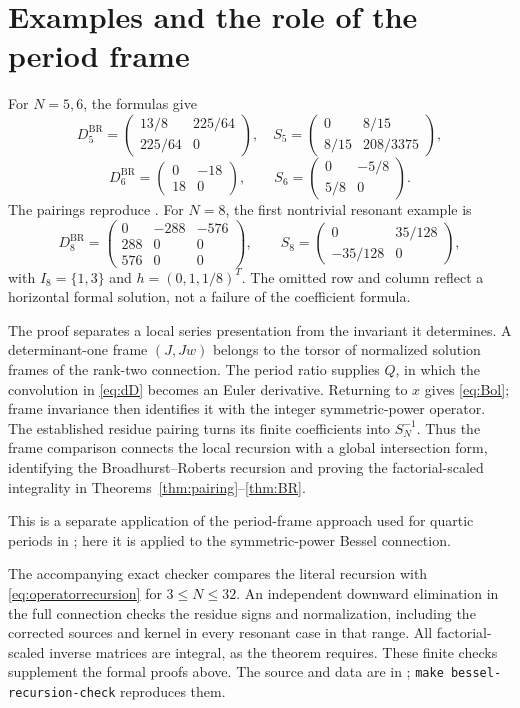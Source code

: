 \documentclass[11pt]{article}
\theoremstyle{definition}
\newcommand{\BR}{\mathrm{BR}}
\numberwithin{equation}{section}
\begin{document}
\section{Examples and the role of the period frame}

For $N=5,6$, the formulas give
\[
 D_5^{\BR}=\begin{pmatrix}13/8&225/64\\225/64&0\end{pmatrix},\quad
 S_5=\begin{pmatrix}0&8/15\\8/15&208/3375\end{pmatrix},
\]
\[
 D_6^{\BR}=\begin{pmatrix}0&-18\\18&0\end{pmatrix},\qquad
 S_6=\begin{pmatrix}0&-5/8\\5/8&0\end{pmatrix}.
\]
The pairings reproduce \cite[Examples 3.19--3.20]{FSY}.
For $N=8$, the first nontrivial resonant example is
\[
 D_8^{\BR}=\begin{pmatrix}0&-288&-576\\288&0&0\\576&0&0\end{pmatrix},
 \qquad S_8=\begin{pmatrix}0&35/128\\-35/128&0\end{pmatrix},
\]
with $I_8=\{1,3\}$ and $h=(0,1,1/8)^T$.
The omitted row and column reflect a horizontal formal solution,
not a failure of the coefficient formula.

The proof separates a local series presentation from the invariant
it determines. A determinant-one frame $(J,Jw)$ belongs to the
torsor of normalized solution frames of the rank-two connection.
The period ratio supplies $Q$, in which the convolution in
\eqref{eq:dD} becomes an Euler derivative.
Returning to $x$ gives \eqref{eq:Bol}; frame invariance then identifies
it with the integer symmetric-power operator. The established
residue pairing turns its finite coefficients into $S_N^{-1}$.
Thus the frame comparison connects the local recursion with a global
intersection form, identifying the Broadhurst--Roberts recursion
and proving the factorial-scaled integrality in
Theorems~\ref{thm:pairing}--\ref{thm:BR}.

This is a separate application of the period-frame approach used for
quartic periods in \cite{Quartic}; here it is applied to the
symmetric-power Bessel connection.

The accompanying exact checker compares the literal recursion with
\eqref{eq:operatorrecursion} for $3\le N\le32$.
An independent downward elimination in the full connection checks
the residue signs and normalization, including the corrected sources
and kernel in every resonant case in that range.
All factorial-scaled inverse matrices are integral, as the theorem
requires. These finite checks supplement the formal proofs above.
The source and data are in ;
\texttt{make bessel-recursion-check} reproduces them.



\end{document}
